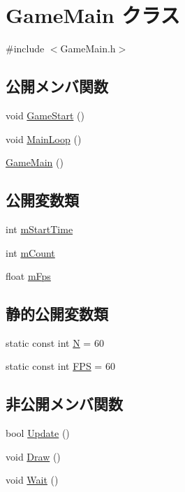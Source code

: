 \hypertarget{class_game_main}{\section{Game\+Main クラス}
\label{class_game_main}
}


{\ttfamily \#include $<$Game\+Main.\+h$>$}

\subsection*{公開メンバ関数}
\begin{DoxyCompactItemize}
\item 
void \hyperlink{class_game_main_a33ec044049ba66a511632776ea609246}{Game\+Start} ()
\item 
void \hyperlink{class_game_main_ad9475bacd59874a961c715f9347eb57e}{Main\+Loop} ()
\item 
\hyperlink{class_game_main_acc3bbdc99511554dd9afda65e7d5f0ef}{Game\+Main} ()
\end{DoxyCompactItemize}
\subsection*{公開変数類}
\begin{DoxyCompactItemize}
\item 
int \hyperlink{class_game_main_a7e8d331a37fb0910a8369e0f971eac72}{m\+Start\+Time}
\item 
int \hyperlink{class_game_main_a75b2b9e2818a643f4ed5ee8a02132516}{m\+Count}
\item 
float \hyperlink{class_game_main_a796aea62906d2d46927a4f12420e9620}{m\+Fps}
\end{DoxyCompactItemize}
\subsection*{静的公開変数類}
\begin{DoxyCompactItemize}
\item 
static const int \hyperlink{class_game_main_af369063b5921fa53f89d3c34ca8ab8c3}{N} = 60
\item 
static const int \hyperlink{class_game_main_a58fcd65ed83d0f30475149e084354040}{F\+P\+S} = 60
\end{DoxyCompactItemize}
\subsection*{非公開メンバ関数}
\begin{DoxyCompactItemize}
\item 
bool \hyperlink{class_game_main_aaa2bf042f2c2615180bb3accc74d4f34}{Update} ()
\item 
void \hyperlink{class_game_main_aecebe55e01987341eb5a934de103894f}{Draw} ()
\item 
void \hyperlink{class_game_main_ad0def9978a87d0becdf781a6bb051096}{Wait} ()
\end{DoxyCompactItemize}
